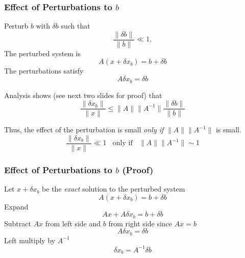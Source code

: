 \documentclass[10pt]{beamer}
\newcommand{\norm}[1]{{\ensuremath{{\|#1\|}}}}
\begin{document}
\begin{frame}
\frametitle{Effect of Perturbations to $b$}

Perturb $b$ with $\delta b$ such that
\begin{equation*}
    \frac{\norm{\delta b}}{\norm{b}} \ll 1,
\end{equation*}
The perturbed system is
\begin{equation*}
    A (x + \delta x_b) = b + \delta b
\end{equation*}
The perturbations satisfy
\begin{equation*}
    A \delta x_b = \delta b
\end{equation*}


Analysis shows (see next two slides for proof) that
\begin{equation*}
    \frac{\norm{\delta x_b}}{\norm{x}} \le \norm{A}\norm{A^{-1}} \frac{\norm{\delta b}}{{\norm{b}}}
\end{equation*}

Thus, the effect of the perturbation is small
\emph{only if} $\norm{A}\norm{A^{-1}}$ is small.
\begin{equation*}
    \frac{\norm{\delta x_b}}{\norm{x}} \ll 1
    \ \ \ \ \text{only if}
    \ \ \ \ \norm{A}\norm{A^{-1}} \sim 1
\end{equation*}

\end{frame}
\begin{frame}
\frametitle{Effect of Perturbations to $b$ (Proof)}


Let $x + \delta x_b$ be the \emph{exact} solution to the perturbed system
\begin{equation}   \label{eq:axdb}
    A (x + \delta x_b) = b + \delta b
\end{equation}
Expand
\begin{equation*}
    Ax + A \delta x_b = b + \delta b
\end{equation*}
Subtract $Ax$ from left side and $b$ from right side since $Ax=b$
\begin{equation*}
    A \delta x_b = \delta b
\end{equation*}
Left multiply by $A^{-1}$
\begin{equation}   \label{eq:dxb}
    \delta x_b = A^{-1} \delta b
\end{equation}


\end{frame}
\end{document}
